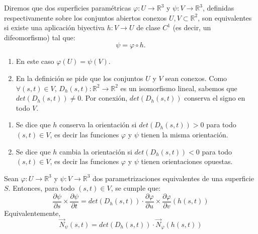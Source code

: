 \begin{definición}  Diremos que dos superficies paramétricas \( \varphi: U \to \mathbb{R}^3 \) y \( \psi: V \to \mathbb{R}^3 \), definidas respectivamente sobre los conjuntos abiertos conexos \( U, V \subset \mathbb{R}^2 \), son equivalentes si existe una aplicación biyectiva \( h: V \to U \) de clase \( C^1 \) (es decir, un difeomorfismo) tal que: \[ \psi = \varphi \circ h. \]
\end{definición}

\begin{observación}
\vspace{-2.5em}
\begin{enumerate}
    \item En este caso $\varphi(U) = \psi(V)$.
    \item En la definición se pide que los conjuntos $U$ y $V$ sean conexos. Como
          $\forall (s,t) \in V$, $D_h(s,t) : \mathbb{R}^2 \to \mathbb{R}^2$ es un
          isomorfismo lineal, sabemos que $det(D_h(s,t)) \neq 0$. Por conexión,
          $det(D_h(s,t))$ conserva el signo en todo $V$.
\end{enumerate}
\end{observación}

\begin{definición} 
\vspace{-2.5em}
\begin{enumerate}
    \item Se dice que $h$ conserva la orientación si $det(D_h(s,t)) > 0$ para todo $(s,t)
              \in V$, es decir las funciones $\varphi$ y $\psi$ tienen la misma orientación.
    \item Se dice que $h$ cambia la orientación si $det(D_h(s,t)) < 0$ para todo $(s,t)
              \in V$, es decir las funciones $\varphi$ y $\psi$ tienen orientaciones
          opuestas.
\end{enumerate}
\end{definición}

\begin{lema}
    Sean \( \varphi: U \to \mathbb{R}^3 \) y \( \psi: V \to \mathbb{R}^3 \) dos parametrizaciones equivalentes de una superficie \( S \). Entonces, para todo \( (s,t) \in V \), se cumple que:
    \[
        \frac{\partial \psi}{\partial s} \times \frac{\partial \psi}{\partial t} = det(D_h(s,t)) \cdot \frac{\partial \varphi}{\partial u} \times \frac{\partial \varphi}{\partial v} (h(s,t))
    \]
    Equivalentemente,
    \[
        \vec{N}_{\psi} (s,t) = det(D_h(s,t)) \cdot \vec{N}_{\varphi}(h(s,t))
    \]
\end{lema}

